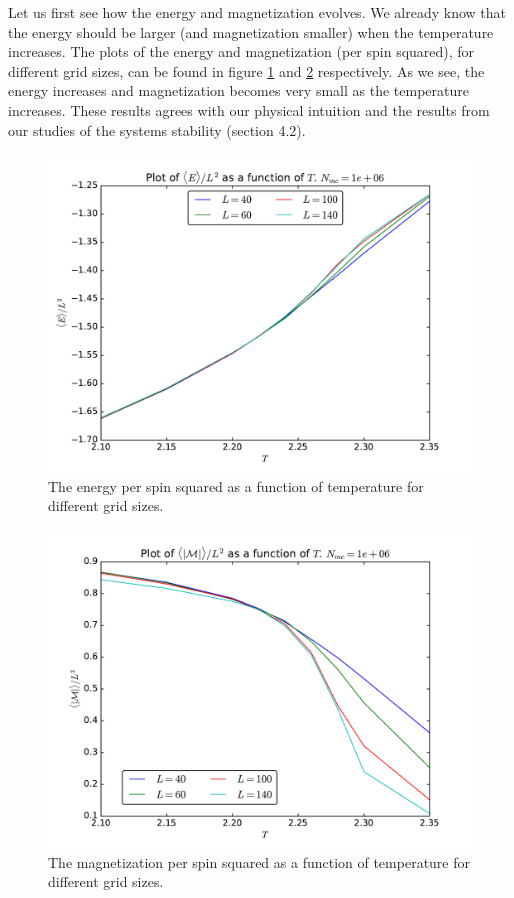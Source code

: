 \documentclass[12pt]{article}
\begin{document}
Let us first see how the energy and magnetization evolves. We already know that the energy should be larger (and magnetization smaller) when the temperature increases. The plots of the energy and magnetization (per spin squared), for different grid sizes, can be found in figure \ref{fig:parallell_energy} and \ref{fig:parallell_magnetization} respectively. As we see, the energy increases and magnetization becomes very small as the temperature increases. These results agrees with our physical intuition and the results from our studies of the systems stability (section 4.2).
\begin{figure}[H]
\centering
\includegraphics[width=\linewidth]{Plots/Energy_parallellization.pdf}\caption{The energy per spin squared as a function of temperature for different grid sizes.}
\label{fig:parallell_energy}
\end{figure}

\begin{figure}[H]
\centering
\includegraphics[width=\linewidth]{Plots/Magnetization_parallellization.pdf}
\caption{The magnetization per spin squared as a function of temperature for different grid sizes.}
\label{fig:parallell_magnetization}
\end{figure}
\end{document}
